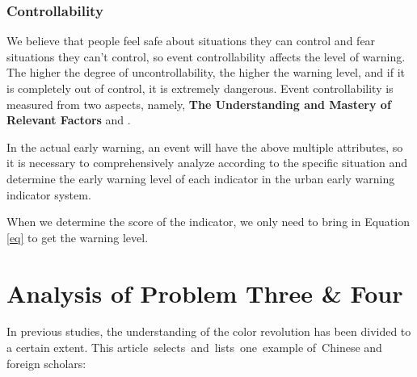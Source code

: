 \documentclass[12pt]{article}  %
\begin{document}
\subsubsection{Controllability}
We believe that people feel safe about situations they can control and fear situations they can't control, so event controllability affects the level of warning. The higher the degree of uncontrollability, the higher the warning level, and if it is completely out of control, it is extremely dangerous. Event controllability is measured from two aspects, namely, \textbf{The Understanding and Mastery of Relevant Factors} and .

In the actual early warning, an event will have the above multiple attributes, so it is necessary to comprehensively analyze according to the specific situation and determine the early warning level of each indicator in the urban early warning indicator system.

When we determine the score of the indicator, we only need to bring in Equation \ref{eq} to get the warning level.
\section{Analysis of Problem Three \& Four}
In previous studies, the understanding of the color revolution has been divided to a certain extent. This article selects and lists one example of Chinese and foreign scholars:
\end{document}

